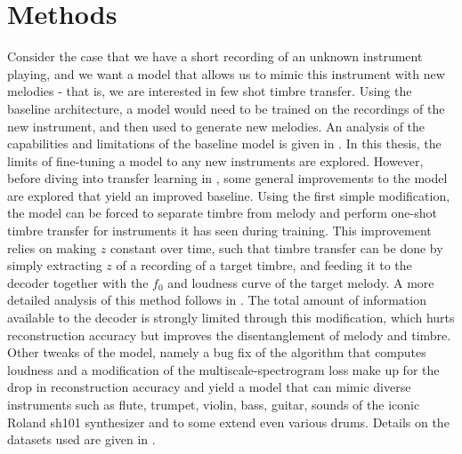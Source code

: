 
\chapter{Methods}
\label{methods}
Consider the case that we have a short recording of an unknown instrument playing, and we want a model that allows us to mimic this instrument with new melodies - that is, we are interested in few shot timbre transfer.
Using the baseline architecture, a model would need to be trained on the recordings of the new instrument, and then used to generate new melodies. An analysis of the capabilities and limitations of the baseline model is given in .
In this thesis, the limits of fine-tuning a model to any new instruments are explored. However, before diving into transfer learning in , some general improvements to the model are explored that yield an improved baseline. \newline
Using the first simple modification, the model can be forced to separate timbre from melody and perform one-shot timbre transfer for instruments it has seen during training.
This improvement relies on making $z$ constant over time, such that timbre transfer can be done by simply extracting $z$ of a recording of a target timbre, and feeding it to the decoder together with the $f_0$ and loudness curve of the target melody.
A more detailed analysis of this method follows in . \newline
The total amount of information available to the decoder is strongly limited through this modification, which hurts reconstruction accuracy but improves the disentanglement of melody and timbre. Other tweaks of the model, namely a bug fix of the algorithm that computes loudness and a modification of the multiscale-spectrogram loss make up for the drop in reconstruction accuracy and yield a model that can mimic diverse instruments such as flute, trumpet, violin, bass, guitar, sounds of the iconic Roland sh101 synthesizer and to some extend even various drums. \newline
Details on the datasets used are given in . \newline



